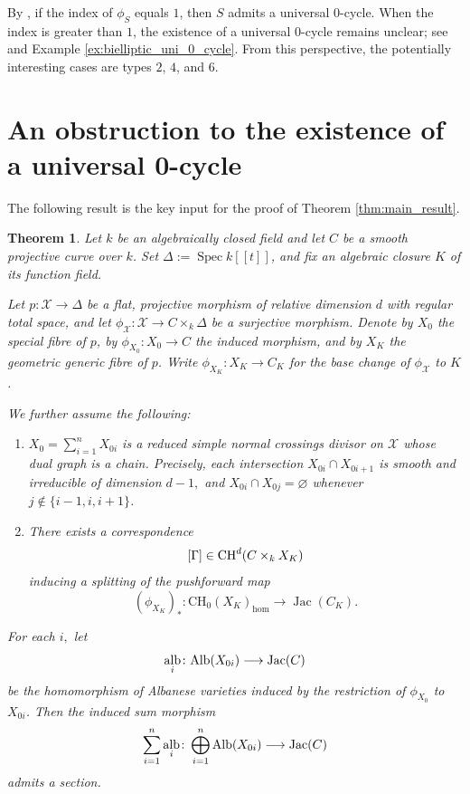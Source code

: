 \documentclass[11pt,letterpaper]{amsart}
\newcommand{\Alb}{\textnormal{Alb}}
\newcommand{\CH}{\textnormal{CH}}
\numberwithin{equation}{section}
\newtheorem{theorem}{Theorem}[section]
\theoremstyle{definition}
\theoremstyle{remark}
\DeclareMathOperator{\al}{alb}
\newcommand{\Ch}{\operatorname{CH_{0}}}
\DeclareMathOperator{\Spec}{Spec}
\DeclareMathOperator{\jac}{Jac}
\begin{document}
By \cite[Proposition 2.7]{voisin_a}, if the index of $\phi_S$ equals $1$, then $S$ admits a universal $0$-cycle. When the index is greater than $1$, the existence of a universal $0$-cycle remains unclear; see \cite[\S 2.2]{voisin_a} and Example \ref{ex:bielliptic_uni_0_cycle}. From this perspective, the potentially interesting cases are types $2$, $4$, and $6$.

\section{An obstruction to the existence of a universal 0-cycle}\label{sec:obstruction}
The following result is the key input for the proof of Theorem \ref{thm:main_result}.

\begin{theorem}
\label{thm:obstruction}
Let $k$ be an algebraically closed field and let $C$ be a smooth projective curve over $k$. Set $\Delta := \Spec k[[t]]$, and fix an algebraic closure $K$ of its function field. 

Let $p \colon \mathcal{X} \to \Delta$ be a flat, projective morphism of relative dimension $d$ with regular total space, and let $\phi_{\mathcal{X}} \colon \mathcal{X} \to C \times_k \Delta$ be a surjective morphism.
Denote by $X_0$ the special fibre of $p$, by
$\phi_{X_0} \colon X_0 \to C$ the induced morphism, and by $X_{K
}$ the geometric generic fibre of $p$. Write $\phi_{X_K} \colon X_K \to C_K$
for the base change of $\phi_{\mathcal{X}}$ to $K$.\par
We further assume the following:
\begin{enumerate}
    \item \label{it:X_0} $X_{0}=\sum_{i=1}^{n}X_{0i}$ is a reduced simple normal crossings divisor on $\mathcal{X}$ whose dual graph is a chain. Precisely, each intersection $X_{0i}\cap X_{0i+1}$ is smooth and irreducible of dimension $d-1,$ and $X_{0i}\cap X_{0j}=\varnothing$ whenever $j\notin\{i-1,i,i+1\}$.
    \item \label{it:correspondence} 
    There exists a correspondence
$$
[\Gamma] \in \CH^{d}(C \times_k X_{K})
$$
inducing a splitting of the pushforward map
$$
(\phi_{X_K})_\ast\colon \Ch(X_{K})_{\hom}\longrightarrow\jac(C_{K}).
$$
    
\end{enumerate}
\par 
For each $i,$ let $$\al_{i}\colon\Alb(X_{0i})\longrightarrow \jac(C)$$ be the homomorphism of Albanese varieties induced by the restriction of $\phi_{X_0}$ to $X_{0i}$. Then the induced sum morphism $$\sum_{i=1}^{n}\al_{i}\colon\bigoplus_{i=1}^{n}\Alb(X_{0i})\longrightarrow\jac(C)$$
admits a section. 
\end{theorem}
\end{document}
